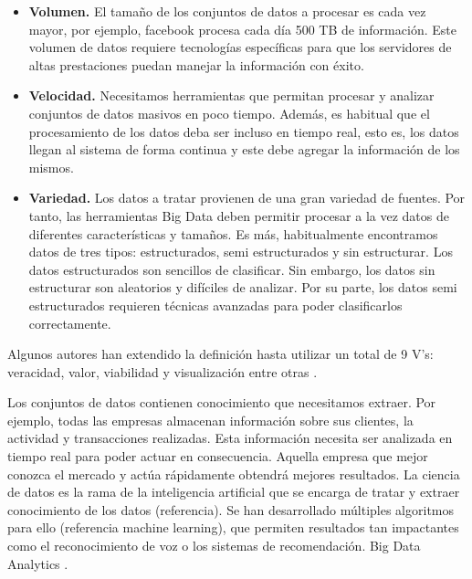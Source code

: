 \documentclass{article}
\begin{document}
	\begin{itemize}
		\item \textbf{Volumen.} El tamaño de los conjuntos de datos a procesar es cada vez mayor, por ejemplo, facebook procesa cada día 500 TB de información. Este volumen de datos requiere tecnologías específicas para que los servidores de altas prestaciones puedan manejar la información con éxito.
		\item \textbf{Velocidad.} Necesitamos herramientas que permitan procesar y analizar conjuntos de datos masivos en poco tiempo. Además, es habitual que el procesamiento de los datos deba ser incluso en tiempo real, esto es, los datos llegan al sistema de forma continua y este debe agregar la información de los mismos.
		\item \textbf{Variedad.} Los datos a tratar provienen de una gran variedad de fuentes. Por tanto, las herramientas Big Data deben permitir procesar a la vez datos de diferentes características y tamaños. Es más, habitualmente encontramos datos de tres tipos: estructurados, semi estructurados y sin estructurar. Los datos estructurados son sencillos de clasificar. Sin embargo, los datos sin estructurar son aleatorios y difíciles de analizar. Por su parte, los datos semi estructurados requieren técnicas avanzadas para poder clasificarlos correctamente.
	\end{itemize}

	Algunos autores han extendido la definición hasta utilizar un total de 9 V's: veracidad, valor, viabilidad y visualización entre otras \cite{understanding-big-data}.

	Los conjuntos de datos contienen conocimiento que necesitamos extraer. Por ejemplo, todas las empresas almacenan información sobre sus clientes, la actividad y transacciones realizadas. Esta información necesita ser analizada en tiempo real para poder actuar en consecuencia. Aquella empresa que mejor conozca el mercado y actúa rápidamente obtendrá mejores resultados. La ciencia de datos es la rama de la inteligencia artificial que se encarga de tratar y extraer conocimiento de los datos (referencia). Se han desarrollado múltiples algoritmos para ello (referencia machine learning), que permiten resultados tan impactantes como el reconocimiento de voz o los sistemas de recomendación. Big Data Analytics \cite{big-data-trends}. 

\end{document}
